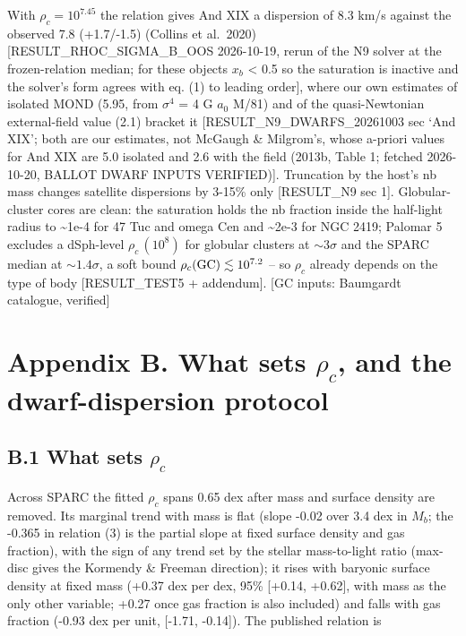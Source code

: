 \documentclass[
  10pt,
]{article}
\begin{document}
With $\rho_c=10^{7.45}$ the relation gives And XIX a dispersion of 8.3 km/s
against the observed 7.8 (+1.7/-1.5) (Collins et al.~2020)
{[}RESULT\_RHOC\_SIGMA\_B\_OOS 2026-10-19, rerun of the N9 solver at the
frozen-relation median; for these objects $x_b$ \textless{} 0.5 so the
saturation is inactive and the solver's form agrees with eq. (1) to
leading order{]}, where our own estimates of isolated MOND (5.95, from
$\sigma^4$ = 4 G $a_0$ M/81) and of the quasi-Newtonian external-field
value (2.1) bracket it {[}RESULT\_N9\_DWARFS\_20261003 sec `And XIX';
both are our estimates, not McGaugh \& Milgrom's, whose a-priori values
for And XIX are 5.0 isolated and 2.6 with the field (2013b,
Table 1; fetched 2026-10-20, BALLOT DWARF INPUTS VERIFIED){]}.
Truncation by the host's nb mass changes satellite dispersions by 3-15\%
only {[}RESULT\_N9 sec 1{]}. Globular-cluster cores are clean: the
saturation holds the nb fraction inside the half-light radius to
\textasciitilde{}1e-4 for 47 Tuc and omega Cen and \textasciitilde{}2e-3 for
NGC 2419; Palomar 5 excludes a dSph-level $\rho_c\,(10^{8})$ for globular clusters
at $\sim3\sigma$ and the SPARC median at $\sim1.4\sigma$, a soft bound $\rho_c({\rm GC})\lesssim 10^{7.2}$ --
so $\rho_c$ already depends on the type of body {[}RESULT\_TEST5 +
addendum{]}. {[}GC inputs: Baumgardt catalogue, verified{]}

\section{Appendix B. What sets $\rho_c$, and the dwarf-dispersion protocol}\label{appendix-b.-what-sets-rho_c-and-the-dwarf-dispersion-protocol}

\subsection{B.1 What sets $\rho_c$}\label{what-sets-rho_c}

Across SPARC the fitted $\rho_c$ spans 0.65 dex after mass and surface
density are removed. Its marginal trend with mass is flat (slope -0.02
over 3.4 dex in $M_b$; the -0.365 in relation (3) is the partial slope at
fixed surface density and gas fraction), with the sign of any trend set
by the stellar mass-to-light ratio (max-disc gives the Kormendy \&
Freeman direction); it rises with baryonic surface density at fixed mass
(+0.37 dex per dex, 95\% {[}+0.14, +0.62{]}, with mass as the only other
variable; +0.27 once gas fraction is also included) and falls with gas
fraction (-0.93 dex per unit, {[}-1.71, -0.14{]}). The published
relation is
\end{document}
